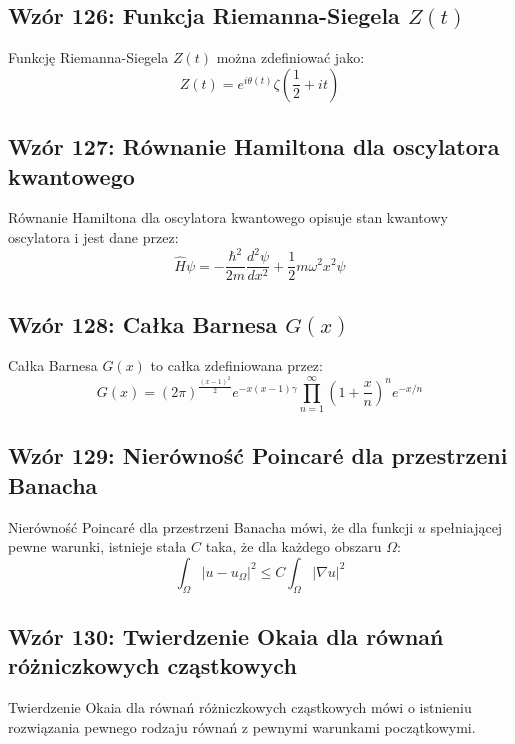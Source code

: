 \documentclass{article}
\begin{document}
\subsection*{Wzór 126: Funkcja Riemanna-Siegela \(Z(t)\)}

Funkcję Riemanna-Siegela \(Z(t)\) można zdefiniować jako:
\[ Z(t) = e^{i\theta(t)}\zeta\left(\frac{1}{2} + it\right) \]

\subsection*{Wzór 127: Równanie Hamiltona dla oscylatora kwantowego}

Równanie Hamiltona dla oscylatora kwantowego opisuje stan kwantowy oscylatora i jest dane przez:
\[ \hat{H}\psi = -\frac{\hbar^2}{2m}\frac{d^2\psi}{dx^2} + \frac{1}{2}m\omega^2x^2\psi \]

\subsection*{Wzór 128: Całka Barnesa \(G(x)\)}

Całka Barnesa \(G(x)\) to całka zdefiniowana przez:
\[ G(x) = (2\pi)^{\frac{(x-1)^2}{2}}e^{-x(x-1)\gamma} \prod_{n=1}^{\infty}\left(1+\frac{x}{n}\right)^ne^{-x/n} \]

\subsection*{Wzór 129: Nierówność Poincaré dla przestrzeni Banacha}

Nierówność Poincaré dla przestrzeni Banacha mówi, że dla funkcji \(u\) spełniającej pewne warunki, istnieje stała \(C\) taka, że dla każdego obszaru \(\Omega\):
\[ \int_{\Omega} |u - u_{\Omega}|^2 \leq C \int_{\Omega} |\nabla u|^2 \]

\subsection*{Wzór 130: Twierdzenie Okaia dla równań różniczkowych cząstkowych}

Twierdzenie Okaia dla równań różniczkowych cząstkowych mówi o istnieniu rozwiązania pewnego rodzaju równań z pewnymi warunkami początkowymi.
\end{document}
